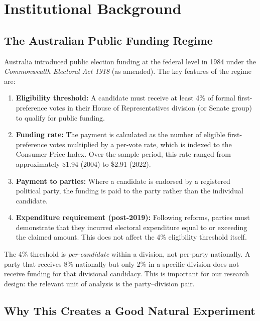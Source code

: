 \documentclass[12pt, a4paper]{article}
\begin{document}
\section{Institutional Background}
\label{sec:background}

\subsection{The Australian Public Funding Regime}

Australia introduced public election funding at the federal level in 1984 under the \emph{Commonwealth Electoral Act 1918} (as amended). The key features of the regime are:

\begin{enumerate}
    \item \textbf{Eligibility threshold:} A candidate must receive at least 4\% of formal first-preference votes in their House of Representatives division (or Senate group) to qualify for public funding.

    \item \textbf{Funding rate:} The payment is calculated as the number of eligible first-preference votes multiplied by a per-vote rate, which is indexed to the Consumer Price Index. Over the sample period, this rate ranged from approximately \$1.94 (2004) to \$2.91 (2022).

    \item \textbf{Payment to parties:} Where a candidate is endorsed by a registered political party, the funding is paid to the party rather than the individual candidate.

    \item \textbf{Expenditure requirement (post-2019):} Following reforms, parties must demonstrate that they incurred electoral expenditure equal to or exceeding the claimed amount. This does not affect the 4\% eligibility threshold itself.
\end{enumerate}

The 4\% threshold is \emph{per-candidate} within a division, not per-party nationally. A party that receives 8\% nationally but only 2\% in a specific division does not receive funding for that divisional candidacy. This is important for our research design: the relevant unit of analysis is the party--division pair.

\subsection{Why This Creates a Good Natural Experiment}
\end{document}
